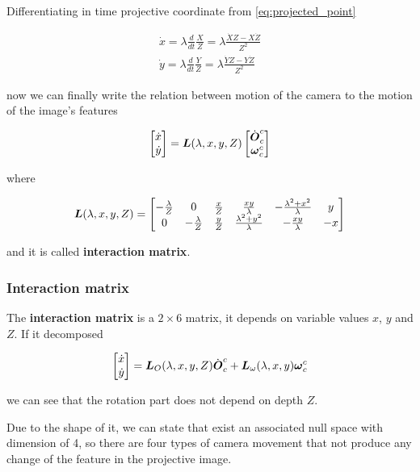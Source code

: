 Differentiating in time projective coordinate from \autoref{eq:projected_point}

\begin{gather*}
	\dot{x} = \lambda \frac{d}{dt}\frac{X}{Z} = \lambda \frac{\dot{X}Z - X\dot{Z}}{Z^2} \\
	\dot{y} = \lambda \frac{d}{dt}\frac{Y}{Z} = \lambda \frac{\dot{Y}Z - Y\dot{Z}}{Z^2}
\end{gather*}

now we can finally write the relation between motion of the camera to the motion of the image's features

\[
	\begin{bmatrix} \dot{x} \\ \dot{y} \end{bmatrix} =
	\boldsymbol{L}(\lambda, x, y, Z)
	\begin{bmatrix} \dot{\boldsymbol{O}}_c^c \\ \boldsymbol{\omega}_c^c \end{bmatrix}
\]

where

\[
	\boldsymbol{L}(\lambda, x, y, Z) =
	\begin{bmatrix}
		-\frac{\lambda}{Z} & 0 & \frac{x}{Z} & \frac{xy}{\lambda} & -\frac{\lambda^2 + x^2}{\lambda}  & y \\
		0 & -\frac{\lambda}{Z} & \frac{y}{Z} & \frac{\lambda^2 + y^2}{\lambda} & -\frac{xy}{\lambda} & -x
	\end{bmatrix}
\]

and it is called \textbf{interaction matrix}.

\subsubsection{Interaction matrix}

The \textbf{interaction matrix} is a $2\times6$ matrix, it depends on variable values $x$, $y$ and $Z$.
If it decomposed

\[
	\begin{bmatrix} \dot{x} \\ \dot{y} \end{bmatrix} =
	\boldsymbol{L}_O(\lambda, x, y, Z) \dot{\boldsymbol{O}}_c^c + \boldsymbol{L}_\omega(\lambda, x, y) \boldsymbol{\omega}_c^c
\]

we can see that the rotation part does not depend on depth $Z$.

Due to the shape of it, we can state that exist an associated null space with dimension of 4, so there are four types of camera movement that not produce any change of the feature in the projective image.

